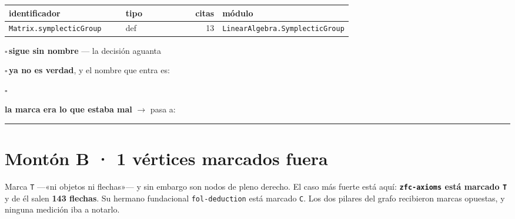 \documentclass[10pt,a4paper]{article}
\begin{document}
\noindent\small\begin{tabular}{@{}>{\raggedright\arraybackslash}p{0.34\linewidth}l r>{\raggedright\arraybackslash}p{0.34\linewidth}@{}}\toprule
identificador & tipo & citas & módulo\\\midrule
\texttt{Matrix.\allowbreak{}symplecticGroup} & def & 13 & \texttt{LinearAlgebra.\allowbreak{}SymplecticGroup}\\
\bottomrule\end{tabular}\par\smallskip
\noindent$\square$\,{\small \textbf{sigue sin nombre} — la decisión aguanta}\par
\noindent$\square$\,{\small \textbf{ya no es verdad}, y el nombre que entra es: \dotfill}\par
\noindent$\square$\,{\small \textbf{la marca era lo que estaba mal} $\rightarrow$ pasa a: \rule{2em}{0.4pt}}\par
\medskip
\newpage
\section*{Montón B · 1 vértices marcados fuera}

Marca \texttt{T} —«ni objetos ni flechas»— y sin embargo son nodos de pleno
derecho. El caso más fuerte está aquí: \textbf{\texttt{zfc-axioms} está
marcado \texttt{T}} y de él salen \textbf{143 flechas}. Su hermano fundacional
\texttt{fol-deduction} está marcado \texttt{C}. Los dos pilares del grafo
recibieron marcas opuestas, y ninguna medición iba a notarlo.
\par\medskip
\end{document}
